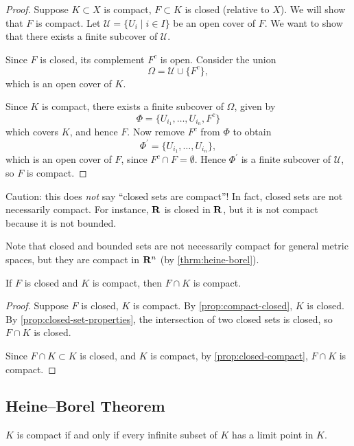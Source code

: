 \begin{proof}
Suppose $K\subset X$ is compact, $F\subset K$ is closed (relative to $X$). We will show that $F$ is compact. Let $\mathcal{U}=\{U_i\mid i\in I\}$ be an open cover of $F$. We want to show that there exists a finite subcover of $\mathcal{U}$.

Since $F$ is closed, its complement $F^c$ is open. Consider the union
\[\Omega=\mathcal{U}\cup\{F^c\},\]
which is an open cover of $K$.

Since $K$ is compact, there exists a finite subcover of $\Omega$, given by
\[\Phi=\{U_{i_1},\dots,U_{i_n},F^c\}\]
which covers $K$, and hence $F$. Now remove $F^c$ from $\Phi$ to obtain
\[\Phi^\prime=\{U_{i_1},\dots,U_{i_n}\},\]
which is an open cover of $F$, since $F^c\cap F=\emptyset$. Hence $\Phi^\prime$ is a finite subcover of $\mathcal{U}$, so $F$ is compact.
\end{proof}

\begin{remark}
Caution: this does \emph{not} say ``closed sets are compact''! In fact, closed sets are not necessarily compact. For instance, $\mathbf R$ is closed in $\mathbf R$, but it is not compact because it is not bounded.

Note that closed and bounded sets are not necessarily compact for general metric spaces, but they are compact in $\mathbf R^n$ (by \cref{thrm:heine-borel}).
\end{remark}

\begin{corollary}
If $F$ is closed and $K$ is compact, then $F\cap K$ is compact.
\end{corollary}

\begin{proof}
Suppose $F$ is closed, $K$ is compact. By \cref{prop:compact-closed}, $K$ is closed. By \cref{prop:closed-set-properties}, the intersection of two closed sets is closed, so $F\cap K$ is closed.

Since $F\cap K\subset K$ is closed, and $K$ is compact, by \cref{prop:closed-compact}, $F\cap K$ is compact.
\end{proof}

\subsection{Heine--Borel Theorem}
\begin{proposition}\label{prop:infinite-compact-lp}
$K$ is compact if and only if every infinite subset of $K$ has a limit point in $K$.
\end{proposition}

